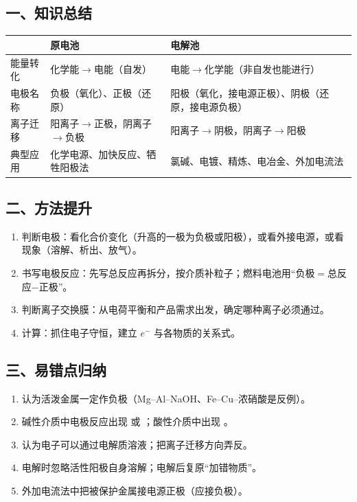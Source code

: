 \subsection*{一、知识总结}
\begin{center}
\small
\begin{tabularx}{\linewidth}{p{1.6cm}XX}
\toprule
& 原电池 & 电解池 \\
\midrule
能量转化 & 化学能$\to$电能（自发） & 电能$\to$化学能（非自发也能进行） \\
电极名称 & 负极（氧化）、正极（还原） & 阳极（氧化，接电源正极）、阴极（还原，接电源负极） \\
离子迁移 & 阳离子$\to$正极，阴离子$\to$负极 & 阳离子$\to$阴极，阴离子$\to$阳极 \\
典型应用 & 化学电源、加快反应、牺牲阳极法 & 氯碱、电镀、精炼、电冶金、外加电流法 \\
\bottomrule
\end{tabularx}
\end{center}

\subsection*{二、方法提升}
\begin{enumerate}
\item 判断电极：看化合价变化（升高的一极为负极或阳极），或看外接电源，或看现象（溶解、析出、放气）。
\item 书写电极反应：先写总反应再拆分，按介质补粒子；燃料电池用“负极$=$总反应$-$正极”。
\item 判断离子交换膜：从电荷平衡和产品需求出发，确定哪种离子必须通过。
\item 计算：抓住电子守恒，建立 $e^-$ 与各物质的关系式。
\end{enumerate}

\subsection*{三、易错点归纳}
\begin{enumerate}
\item 认为活泼金属一定作负极（Mg–Al–NaOH、Fe–Cu–浓硝酸是反例）。
\item 碱性介质中电极反应出现  或 ；酸性介质中出现 。
\item 认为电子可以通过电解质溶液；把离子迁移方向弄反。
\item 电解时忽略活性阳极自身溶解；电解后复原“加错物质”。
\item 外加电流法中把被保护金属接电源正极（应接负极）。
\end{enumerate}

